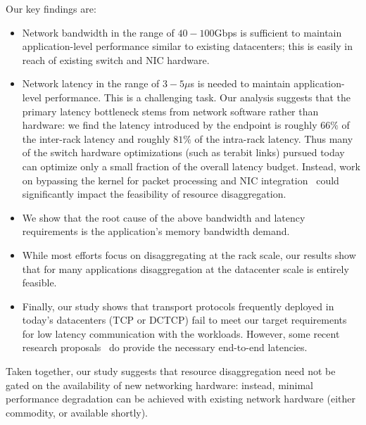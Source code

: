 \noindent Our key findings are:
\vspace{-0.5em}
\begin{itemize}[leftmargin=*]
\itemsep0em
	\item Network bandwidth in the range of $40-100$Gbps  is sufficient to maintain application-level performance similar to existing datacenters; this is easily in reach of existing switch and NIC hardware. 
	\item Network latency in the range of $3-5\mu$s is needed to maintain application-level performance. This is a challenging task. Our analysis suggests that the primary latency bottleneck stems from  network software rather than hardware: we find the latency introduced by the endpoint is roughly $66\%$ of the inter-rack latency and roughly $81\%$ of the intra-rack latency. 
	Thus many of the switch hardware optimizations (such as terabit links) pursued today can optimize only a small fraction of the overall latency budget.
	Instead, work on bypassing the kernel for packet processing and NIC integration~\cite{cpu-nic} could significantly impact the feasibility of resource disaggregation.
	\item We show that the root cause of the above bandwidth and latency requirements is the application's memory bandwidth demand.
	\item While most efforts focus on disaggregating at the rack scale, our results show that for many applications disaggregation at the datacenter scale is entirely feasible.	
 	\item Finally, our study shows that transport protocols frequently deployed in today's datacenters (TCP or DCTCP) fail to meet our target requirements for low latency communication with the \dis workloads. However, some recent research proposals~\cite{pfabric, phost} do provide the necessary end-to-end latencies. 
\end{itemize} 

\noindent
Taken together, our study suggests that resource disaggregation need not be gated on the availability of new networking hardware: instead, minimal performance degradation can be achieved with existing network hardware (either commodity, or available shortly).

